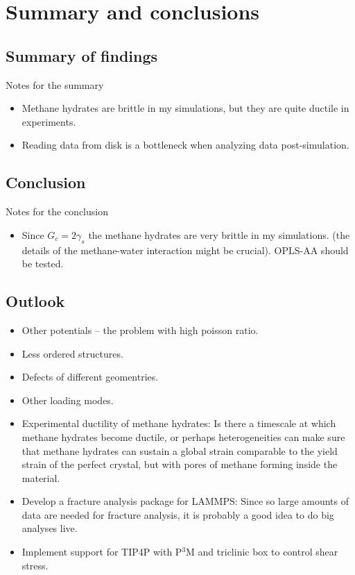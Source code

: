 \chapter{Summary and conclusions}

\section{Summary of findings}
Notes for the summary
\begin{itemize}
\item Methane hydrates are brittle in my simulations, but they are quite ductile in experiments.
\item Reading data from disk is a bottleneck when analyzing data post-simulation. 
\end{itemize}

\section{Conclusion}
Notes for the conclusion
\begin{itemize}
\item Since $G_c = 2\gamma_s$ the methane hydrates are very brittle in my simulations. (the details of the methane-water interaction might be crucial). OPLS-AA should be tested.
\end{itemize}


\section{Outlook}
\begin{itemize}
\item Other potentials – the problem with high poisson ratio.
\item Less ordered structures.
\item Defects of different geomentries.
\item Other loading modes.
\item Experimental ductility of methane hydrates: Is there a timescale at which methane hydrates become ductile, or perhaps heterogeneities can make sure that methane hydrates can sustain a global strain comparable to the yield strain of the perfect crystal, but with pores of methane forming inside the material. 
\item Develop a fracture analysis package for LAMMPS: Since so large amounts of data are needed for fracture analysis, it is probably a good idea to do big analyses live.
\item Implement support for TIP4P with P$^3$M and triclinic box to control shear stress.
\end{itemize}